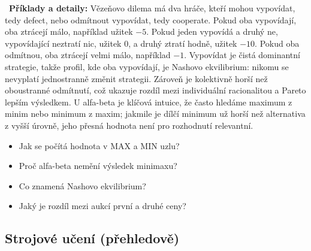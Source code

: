 \begin{odpoved}
\noindent{}\ \textbf{Příklady a detaily:} Vězeňovo dilema má dva hráče, kteří mohou vypovídat, tedy defect, nebo odmítnout vypovídat, tedy cooperate. Pokud oba vypovídají, oba ztrácejí málo, například užitek $-5$. Pokud jeden vypovídá a druhý ne, vypovídající neztratí nic, užitek $0$, a druhý ztratí hodně, užitek $-10$. Pokud oba odmítnou, oba ztrácejí velmi málo, například $-1$. Vypovídat je čistá dominantní strategie, takže profil, kde oba vypovídají, je Nashovo ekvilibrium: nikomu se nevyplatí jednostranně změnit strategii. Zároveň je kolektivně horší než oboustranné odmítnutí, což ukazuje rozdíl mezi individuální racionalitou a Pareto lepším výsledkem. U alfa-beta je klíčová intuice, že často hledáme maximum z minim nebo minimum z maxim; jakmile je dílčí minimum už horší než alternativa z vyšší úrovně, jeho přesná hodnota není pro rozhodnutí relevantní.
\end{odpoved}

\begin{recall}
\begin{itemize}[leftmargin=1.2em,itemsep=0pt,topsep=1pt]
  \item Jak se počítá hodnota v MAX a MIN uzlu?
  \item Proč alfa-beta nemění výsledek minimaxu?
  \item Co znamená Nashovo ekvilibrium?
  \item Jaký je rozdíl mezi aukcí první a druhé ceny?
\end{itemize}
\end{recall}

\subsection{Strojové učení (přehledově)}

